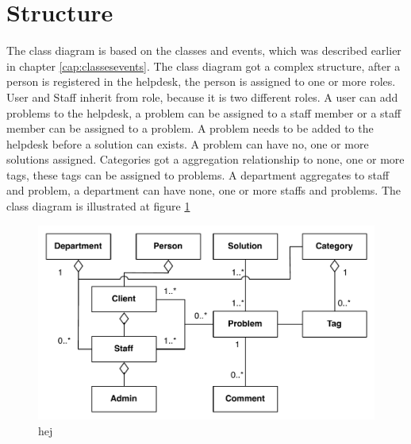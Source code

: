 \section{Structure}

The class diagram is based on the classes and events, which was described earlier in chapter \ref{cap:classesevents}. The class diagram got a complex structure, after a person is registered in the helpdesk, the person is assigned to one or more roles. User and Staff inherit from role, because it is two different roles. A user can add problems to the helpdesk, a problem can be assigned to a staff member or a staff member can be assigned to a problem. A problem needs to be added to the helpdesk before a solution can exists. A problem can have no, one or more solutions assigned. Categories got a aggregation relationship to none, one or more tags, these tags can be assigned to problems. A department aggregates to staff and problem, a department can have none, one or more staffs and problems. The class diagram is illustrated at figure \ref{fig:pdaclassdiagram}

\begin{figure}
\begin{center}
\includegraphics[scale=0.6]{input/problem_domain_analysis/newest_class_diagram.pdf}
\caption{hej}
\label{fig:pdaclassdiagram}
\end{center}
\end{figure}